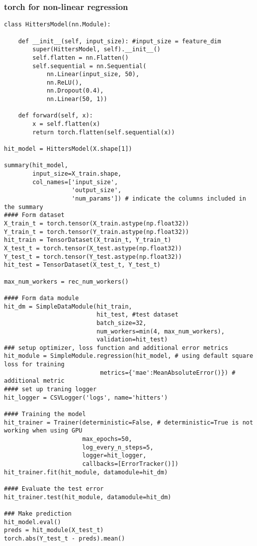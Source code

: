 \documentclass[
  letterpaper,
  DIV=11,
  numbers=noendperiod]{scrreprt}
\begin{document}
\subsubsection{torch for non-linear
regression}\label{torch-for-non-linear-regression}

\begin{verbatim}
class HittersModel(nn.Module):

    def __init__(self, input_size): #input_size = feature_dim
        super(HittersModel, self).__init__()
        self.flatten = nn.Flatten()
        self.sequential = nn.Sequential(
            nn.Linear(input_size, 50),
            nn.ReLU(),
            nn.Dropout(0.4),
            nn.Linear(50, 1))

    def forward(self, x):
        x = self.flatten(x)
        return torch.flatten(self.sequential(x))

hit_model = HittersModel(X.shape[1])

summary(hit_model, 
        input_size=X_train.shape,
        col_names=['input_size',
                   'output_size',
                   'num_params']) # indicate the columns included in the summary
#### Form dataset
X_train_t = torch.tensor(X_train.astype(np.float32))
Y_train_t = torch.tensor(Y_train.astype(np.float32))
hit_train = TensorDataset(X_train_t, Y_train_t)
X_test_t = torch.tensor(X_test.astype(np.float32))
Y_test_t = torch.tensor(Y_test.astype(np.float32))
hit_test = TensorDataset(X_test_t, Y_test_t)

max_num_workers = rec_num_workers()

#### Form data module
hit_dm = SimpleDataModule(hit_train,
                          hit_test, #test dataset
                          batch_size=32,
                          num_workers=min(4, max_num_workers),
                          validation=hit_test)
### setup optimizer, loss function and additional error metrics
hit_module = SimpleModule.regression(hit_model, # using default square loss for training
                           metrics={'mae':MeanAbsoluteError()}) # additional metric
#### set up traning logger
hit_logger = CSVLogger('logs', name='hitters')

#### Training the model
hit_trainer = Trainer(deterministic=False, # deterministic=True is not working when using GPU
                      max_epochs=50,
                      log_every_n_steps=5,
                      logger=hit_logger,
                      callbacks=[ErrorTracker()])
hit_trainer.fit(hit_module, datamodule=hit_dm)

#### Evaluate the test error 
hit_trainer.test(hit_module, datamodule=hit_dm)

### Make prediction
hit_model.eval() 
preds = hit_module(X_test_t)
torch.abs(Y_test_t - preds).mean()

\end{verbatim}
\end{document}

